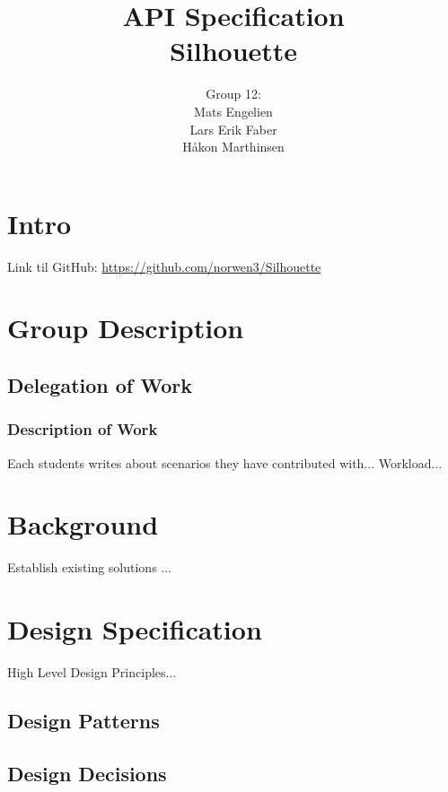 \documentclass[12pt]{article}
\begin{document}
\title{%
    API Specification\\
    \large Silhouette}
\author{%
    Group 12:\\
    Mats Engelien\\
    Lars Erik Faber\\
    Håkon Marthinsen}
\date{}
\maketitle

\newpage

\tableofcontents

\newpage

\section{Intro}

Link til GitHub: \href{https://github.com/norwen3/Silhouette}{https://github.com/norwen3/Silhouette}

\section{Group Description}

\subsection{Delegation of Work}

\subsubsection{Description of Work}
Each students writes about scenarios they have contributed with...
Workload...

\section{Background}
Establish existing solutions ...

\section{Design Specification}
High Level Design Principles...

\subsection{Design Patterns}

\subsection{Design Decisions}
\end{document}
